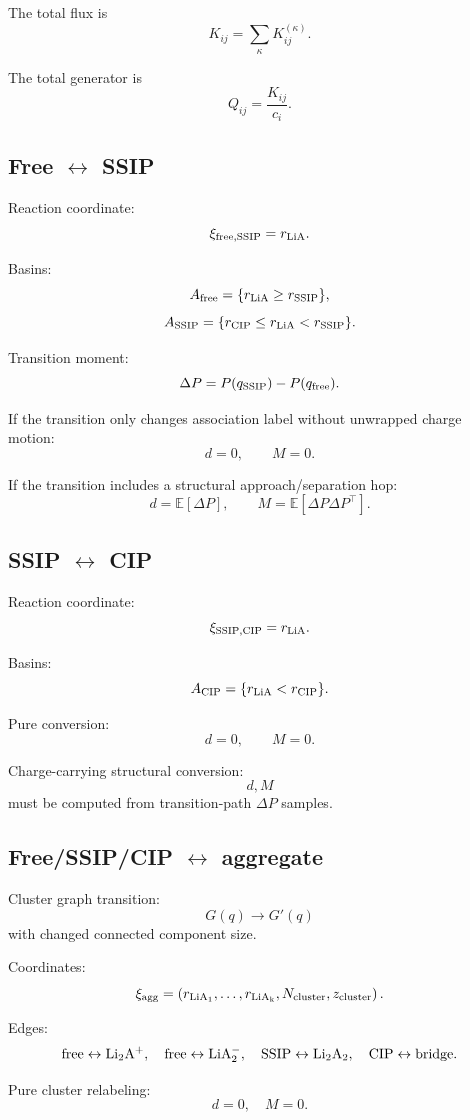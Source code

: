 The total flux is
\[
K_{ij}=\sum_\kappa K_{ij}^{(\kappa)}.
\]

The total generator is
\[
Q_{ij}=\frac{K_{ij}}{c_i}.
\]

\subsection{Free \(\leftrightarrow\) SSIP}

Reaction coordinate:
\[
\xi_{\rm free,SSIP}=r_{\rm LiA}.
\]

Basins:
\[
A_{\rm free}=\{r_{\rm LiA}\ge r_{\rm SSIP}\},
\]
\[
A_{\rm SSIP}=\{r_{\rm CIP}\le r_{\rm LiA}<r_{\rm SSIP}\}.
\]

Transition moment:
\[
\Delta P=P(q_{\rm SSIP})-P(q_{\rm free}).
\]

If the transition only changes association label without unwrapped charge motion:
\[
d=0,\qquad M=0.
\]

If the transition includes a structural approach/separation hop:
\[
d=\mathbb E[\Delta P],
\qquad
M=\mathbb E[\Delta P\Delta P^\top].
\]

\subsection{SSIP \(\leftrightarrow\) CIP}

Reaction coordinate:
\[
\xi_{\rm SSIP,CIP}=r_{\rm LiA}.
\]

Basins:
\[
A_{\rm CIP}=\{r_{\rm LiA}<r_{\rm CIP}\}.
\]

Pure conversion:
\[
d=0,\qquad M=0.
\]

Charge-carrying structural conversion:
\[
d,M
\]
must be computed from transition-path \(\Delta P\) samples.

\subsection{Free/SSIP/CIP \(\leftrightarrow\) aggregate}

Cluster graph transition:
\[
G(q)\to G'(q)
\]
with changed connected component size.

Coordinates:
\[
\xi_{\rm agg}=
\left(
r_{\rm LiA_1},\ldots,r_{\rm LiA_k},
N_{\rm cluster},
z_{\rm cluster}
\right).
\]

Edges:
\[
{\rm free}\leftrightarrow{\rm Li_2A^+},
\quad
{\rm free}\leftrightarrow{\rm LiA_2^-},
\quad
{\rm SSIP}\leftrightarrow{\rm Li_2A_2},
\quad
{\rm CIP}\leftrightarrow{\rm bridge}.
\]

Pure cluster relabeling:
\[
d=0,\quad M=0.
\]


